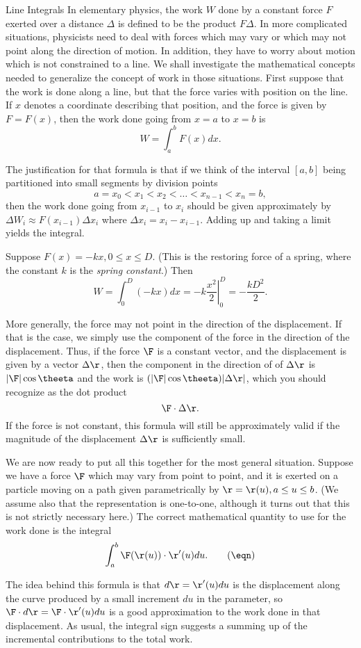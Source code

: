 \subhead Line Integrals \endsubhead
In elementary physics, the work $W$ done by a constant force
$F$ exerted over a distance $\Delta$ is defined to be
the product $F\Delta$.
%
In more complicated situations, physicists need to deal with
forces which may vary or which may not point along the direction
of motion.  In addition, they have to worry about motion which
is not constrained to a line.  We shall investigate the mathematical
concepts needed to generalize the concept of work in those
situations.  First suppose that the work is done along a line,
but that the force varies with position on the line.  If $x$
denotes a coordinate describing that position, and the force
is given by $F = F(x)$, then the work done going from
$x = a$ to $x = b$ is
$$
   W = \int_a^b F(x)dx.
$$
\medskip
\centerline{}
\medskip
The justification for that formula is that if we think of the
interval $[a,b]$ being partitioned into small segments by
division points
$$
 a= x_0 < x_1 < x_2 < \dots < x_{n-1} < x_n = b,
$$
then the work done going from $x_{i-1}$ to $x_i$ should be
given approximately by $\Delta W_i \approx F(x_{i-1})\Delta x_i$
where $\Delta x_i = x_i - x_{i-1}$.  Adding up and taking a limit
yields the integral.

\nextex
{}
Suppose $F(x) = -kx, 0\le x \le D$.  (This is the restoring force
of a spring, where the constant $k$ is the {\it spring constant}.)
Then
$$
     W = \int_0^D (-kx)dx =\left . -k\frac{x^2}2\right\vert_0^D = - \frac {kD^2}2.
$$
\endexample

More generally, the force may not point in the direction of
the displacement.  If that is the case, we simply use the
component of the force in the direction of the displacement.
Thus, if the force $\F$ is a constant vector, and the displacement
is given by a vector $\Delta \r$, then the component in the
direction of of $\Delta \r$ is $|\F|\cos \theeta$ and the work
is $(|\F|\cos \theeta)|\Delta \r|$, which you should recognize
as the dot product
$$
    \F\cdot \Delta\r.
$$
If the force is not constant, this formula will still be approximately
valid if the magnitude of the displacement $\Delta \r$ is sufficiently
small.

We are now ready to put all this together for the most general
situation.  Suppose we have a force $\F$ which may vary from point
to point, and it is exerted on a particle moving on a path
given parametrically by $\r = \r(u), a \le u \le b$.  (We assume
also that the representation is one-to-one, although it turns out
that this is not strictly necessary here.)  The correct mathematical
quantity to use for the work done is the integral
\nexteqn
\xdef\LineInt{\eqn}
$$
   \int_a^b \F(\r(u))\cdot\r'(u) du. \tag\eqn
$$
%
\medskip
\centerline{}
\medskip
The idea behind this formula is that $d\r = \r'(u)du$ is the
displacement along the curve produced by a small increment
$du$ in the parameter, so $\F\cdot d\r = \F\cdot\r'(u)du$
is a good approximation to the work done in that displacement.
As usual, the integral sign suggests a summing up of the
incremental contributions to the total work.

